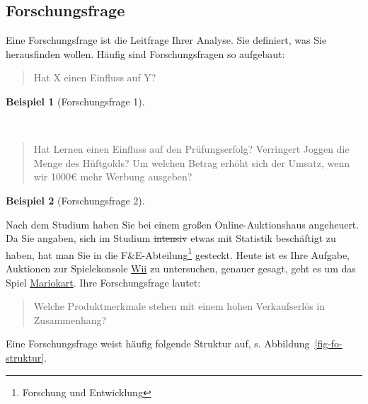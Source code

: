 \documentclass[
  a4paper,
  DIV=11]{scrreprt}
\theoremstyle{definition}
\theoremstyle{definition}
\newtheorem{example}{Beispiel}[chapter]
\theoremstyle{remark}
\begin{document}
\hypertarget{forschungsfrage}{%
\subsection{Forschungsfrage}\label{forschungsfrage}}

Eine Forschungsfrage ist die Leitfrage Ihrer Analyse. Sie definiert, was
Sie herausfinden wollen. Häufig sind Forschungsfragen so aufgebaut:

\begin{quote}
Hat X einen Einfluss auf Y?
\end{quote}

\leavevmode{}%
\begin{example}[Forschungsfrage 1]\label{exm-fofrage1}

~

\begin{quote}
Hat Lernen einen Einfluss auf den Prüfungserfolg? Verringert Joggen die
Menge des Hüftgolds? Um welchen Betrag erhöht sich der Umsatz, wenn wir
1000€ mehr Werbung ausgeben?
\end{quote}

\end{example}

\leavevmode{}%
\begin{example}[Forschungsfrage 2]\label{exm-fofrage2}

Nach dem Studium haben Sie bei einem großen Online-Auktionshaus
angeheuert. Da Sie angaben, sich im Studium \sout{intensiv} etwas mit
Statistik beschäftigt zu haben, hat man Sie in die
F\&E-Abteilung\footnote{Forschung und Entwicklung} gesteckt. Heute ist
es Ihre Aufgabe, Auktionen zur Spielekonsole
\href{https://www.nintendo.de/Wii/Wii-94559.html}{Wii} zu untersuchen,
genauer gesagt, geht es um das Spiel
\href{https://www.nintendo.de/Spiele/Wii/Mario-Kart-Wii-281848.html\#_bersicht}{Mariokart}.
Ihre Forschungsfrage lautet:

\begin{quote}
Welche Produktmerkmale stehen mit einem hohen Verkaufserlös in
Zusammenhang?
\end{quote}

\end{example}

Eine Forschungsfrage weist häufig folgende Struktur auf, s.
Abbildung~\ref{fig-fo-struktur}.
\end{document}
